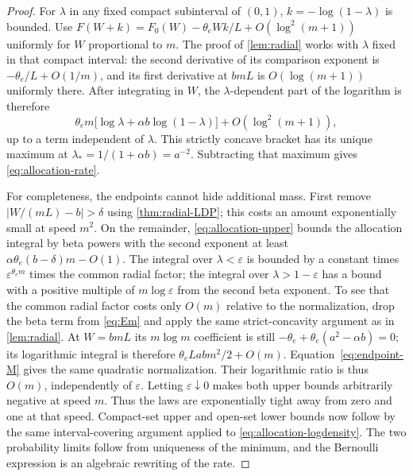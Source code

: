 \documentclass[11pt,a4paper]{article}
\numberwithin{equation}{section}
\theoremstyle{definition}\newaliascnt{definition}{theorem}
\theoremstyle{remark}\newaliascnt{remark}{theorem}
\newcommand{\eps}{\varepsilon}
\begin{document}
\begin{proof}
For $\lambda$ in any fixed compact subinterval of $(0,1)$, $k=-\log(1-\lambda)$
is bounded. Use $F(W+k)=F_0(W)-\theta_eWk/L+O(\log^2(m+1))$ uniformly
for $W$ proportional to $m$. The proof of \cref{lem:radial} works with
$\lambda$ fixed in that compact interval: the second derivative of its
comparison exponent is $-\theta_e/L+O(1/m)$, and its first derivative at
$bmL$ is $O(\log(m+1))$ uniformly there. After integrating in $W$, the
$\lambda$-dependent part of the logarithm is therefore
\begin{equation}
 \theta_e m\bigl[\log\lambda+\alpha b\log(1-\lambda)\bigr]
                           +O(\log^2(m+1)),
 \label{eq:allocation-logdensity}
\end{equation}
up to a term independent of $\lambda$.
This strictly concave bracket has its unique maximum at
$\lambda_*=1/(1+\alpha b)=a^{-2}$. Subtracting that maximum gives
\eqref{eq:allocation-rate}.

For completeness, the endpoints cannot hide additional mass. First remove
$|W/(mL)-b|>\delta$ using \cref{thm:radial-LDP}; this costs an amount
exponentially small at speed $m^2$. On the remainder,
\eqref{eq:allocation-upper} bounds the allocation integral by beta powers
with the second exponent at least $\alpha\theta_e(b-\delta)m-O(1)$.
The integral over $\lambda<\eps$ is bounded by a constant times
$\eps^{\theta_e m}$ times the common radial factor; the integral over
$\lambda>1-\eps$ has a bound with a positive multiple of
$m\log\eps$ from the second beta exponent. To see that the common radial factor costs only $O(m)$ relative to the
normalization, drop the beta term from \eqref{eq:Em} and apply the same
strict-concavity argument as in \cref{lem:radial}. At $W=bmL$ its
$m\log m$ coefficient is still $-\theta_e+\theta_e(a^2-\alpha b)=0$;
its logarithmic integral is therefore
$\theta_eLabm^2/2+O(m)$. Equation~\eqref{eq:endpoint-M} gives the same
quadratic normalization. Their logarithmic ratio is thus $O(m)$,
independently of $\eps$. Letting $\eps\downarrow0$ makes both upper bounds arbitrarily
negative at speed $m$. Thus the laws are exponentially tight away from
zero and one at that speed. Compact-set upper and open-set lower bounds
now follow by the same interval-covering argument applied to
\eqref{eq:allocation-logdensity}. The two probability limits follow from
uniqueness of the minimum, and the Bernoulli expression is an algebraic
rewriting of the rate.
\end{proof}
\end{document}
